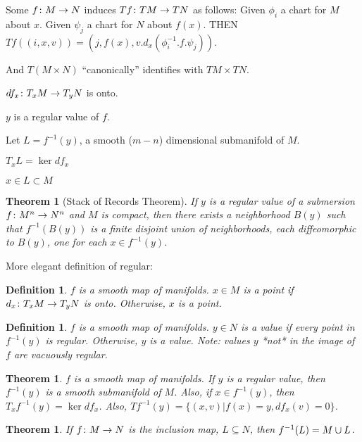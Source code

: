 \documentclass[11pt]{amsbook}
\newenvironment{dateenv}{
	\vspace{1em}
}{
	\vspace{1em}
}
\newcommand{\mydate}[4]{
	\newdate{#1}{#2}{#3}{#4}
	\begin{dateenv}
		\hfill\displaydate{#1}
	\end{dateenv}
}
\theoremstyle{mystyle} %
\newtheorem{thrm}[thm]{Theorem}
\newtheorem{defi}[thm]{Definition}
\numberwithin{thm}{section}
\begin{document}
Some $f\colon M \to N$ induces $Tf \colon TM \to TN$ as follows:
Given $\phi_i$ a chart for $M$ about $x$.
Given $\psi_j$ a chart for $N$ about $f(x)$.
THEN
$Tf((i, x, v)) = (j, f(x), v.d_x(\phi_i^{-1}.f.\psi_j))$.

And $T(M \times N)$ ``canonically'' identifies with $TM \times TN$.


\mydate{d2}{26}{9}{2016}



$df_x \colon T_xM \to T_yN$ is onto.

$y$ is a regular value of $f$.

Let $L = f^{-1}(y)$, a smooth ($m-n$) dimensional submanifold of $M$.

$T_xL = \ker df_x$

$x \in L \subset M$

\begin{thrm}[Stack of Records Theorem]
	If $y$ is a regular value of a submersion $f\colon M^n \to N^n$ and $M$ is compact, then there exists a neighborhood $B(y)$ such that $f^{-1}(B(y))$ is a finite disjoint union of neighborhoods, each diffeomorphic to $B(y)$, one for each $x \in f^{-1}(y)$.
\end{thrm}

\mydate{d3}{28}{9}{2016}

More elegant definition of regular:
\begin{defi}
	$f$ is a smooth map of manifolds.
	$x \in M$ is a  point if $d_x \colon T_xM \to T_yN$ is onto.  Otherwise, $x$ is a  point.
\end{defi}

\begin{defi}
	$f$ is a smooth map of manifolds.
	$y \in N$ is a  value if every point in $f^{-1}(y)$ is regular.  Otherwise, $y$ is a  value.  Note: values $y$ *not* in the image of $f$ are vacuously regular.
\end{defi}

\begin{thrm}
	$f$ is a smooth map of manifolds.
	If $y$ is a regular value, then $f^{-1}(y)$ is a smooth submanifold of $M$.
	Also, if $x \in f^{-1}(y)$, then $T_xf^{-1}(y) = \ker df_x$.
	Also, $Tf^{-1}(y) = \{ (x,v) | f(x)=y, df_x(v) = 0\}$.
\end{thrm}

\begin{thrm}
	If $f\colon M \to N$ is the inclusion map, $L \subseteq N$, then $f^{-1}(L) = M \cup L$.
\end{thrm}
\end{document}
